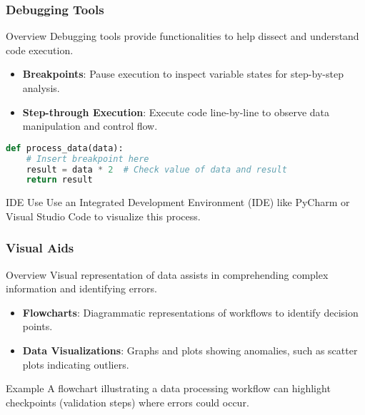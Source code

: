 \documentclass[aspectratio=169]{beamer}
\begin{document}
\begin{frame}[fragile]
    \frametitle{Debugging Tools}
    \begin{block}{Overview}
        Debugging tools provide functionalities to help dissect and understand code execution.
    \end{block}

    \begin{itemize}
        \item \textbf{Breakpoints}: Pause execution to inspect variable states for step-by-step analysis.
        \item \textbf{Step-through Execution}: Execute code line-by-line to observe data manipulation and control flow.
    \end{itemize}

    \begin{lstlisting}[language=Python, caption=A simple example of using a breakpoint]
def process_data(data):
    # Insert breakpoint here
    result = data * 2  # Check value of data and result
    return result
    \end{lstlisting}
    \begin{block}{IDE Use}
        Use an Integrated Development Environment (IDE) like PyCharm or Visual Studio Code to visualize this process.
    \end{block}
\end{frame}

\begin{frame}
    \frametitle{Visual Aids}
    \begin{block}{Overview}
        Visual representation of data assists in comprehending complex information and identifying errors.
    \end{block}

    \begin{itemize}
        \item \textbf{Flowcharts}: Diagrammatic representations of workflows to identify decision points.
        \item \textbf{Data Visualizations}: Graphs and plots showing anomalies, such as scatter plots indicating outliers.
    \end{itemize}

    \begin{block}{Example}
        A flowchart illustrating a data processing workflow can highlight checkpoints (validation steps) where errors could occur.
    \end{block}
\end{frame}
\end{document}
